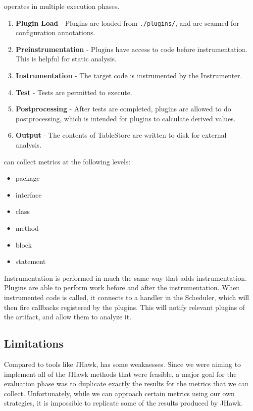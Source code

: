 \mt{} operates in multiple execution phases.
\begin{enumerate}
\item \textbf{Plugin Load} - Plugins are loaded from \texttt{./plugins/}, and are scanned for configuration annotations.
\item \textbf{Preinstrumentation} - Plugins have access to code before instrumentation. This is helpful for static analysis.
\item \textbf{Instrumentation} - The target code is instrumented by the Instrumenter.
\item \textbf{Test} - Tests are permitted to execute. 
\item \textbf{Postprocessing} - After tests are completed, plugins are allowed to do postprocessing, which is intended for plugins to calculate derived values.
\item \textbf{Output} - The contents of TableStore are written to disk for external analysis.
\end{enumerate}

\mt{} can collect metrics at the following levels:

\begin{itemize}
\item package
\item interface
\item class
\item method
\item block
\item statement
\end{itemize}

Instrumentation is performed in much the same way that \ct{} adds instrumentation. Plugins are able to perform work before and after the instrumentation. When instrumented code is called, it connects to a handler in the Scheduler, which will then fire callbacks registered by the plugins. This will notify relevant plugins of the artifact, and allow them to analyze it.

\subsection{Limitations}

Compared to tools like JHawk, \mt{} has some weaknesses. Since we were aiming to implement all of the JHawk methods that were feasible, a major goal for the evaluation phase was to duplicate exactly the results for the metrics that we can collect. Unfortunately, while we can approach certain metrics using our own strategies, it is impossible to replicate some of the results produced by JHawk.

